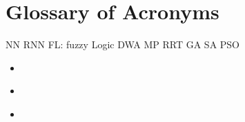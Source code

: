\chapter*{Glossary of Acronyms}

NN
RNN
FL: fuzzy Logic
DWA
MP
RRT
GA
SA
PSO
\begin{itemize}
    \item \textbf{} 
    \item \textbf{} 

    \newpage
    \thispagestyle{acronyms}
    \item \textbf{} 

\end{itemize}

\newpage







